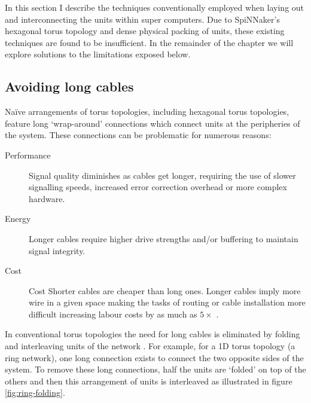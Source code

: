 		In this section I describe the techniques conventionally employed when
		laying out and interconnecting the units within super computers. Due to
		SpiNNaker's hexagonal torus topology and dense physical packing of units,
		these existing techniques are found to be insufficient. In the remainder of
		the chapter we will explore solutions to the limitations exposed below.
		
		\subsection{Avoiding long cables}
			
			Na\"ive arrangements of torus topologies, including hexagonal torus
			topologies, feature long `wrap-around' connections which connect units at
			the peripheries of the system. These connections can be problematic for
			numerous reasons:
			
			\begin{description}
				
				\item[Performance] Signal quality diminishes as cables get longer,
				requiring the use of slower signalling speeds, increased error
				correction overhead or more complex hardware.
				
				\item[Energy] Longer cables require higher drive strengths and/or
				buffering to maintain signal integrity.
				
				\item[Cost] Cost Shorter cables are cheaper than long ones.  Longer
				cables imply more wire in a given space making the tasks of routing or
				cable installation more difficult increasing labour costs by as much as
				$5\times$ \cite{curtis12}.
				
			\end{description}
			
			In conventional torus topologies the need for long cables is eliminated
			by folding and interleaving units of the network \cite{dally04}. For
			example, for a 1D torus topology (a ring network), one long connection
			exists to connect the two opposite sides of the system. To remove these
			long connections, half the units are `folded' on top of the others and
			then this arrangement of units is interleaved as illustrated in figure
			\ref{fig:ring-folding}.
			

